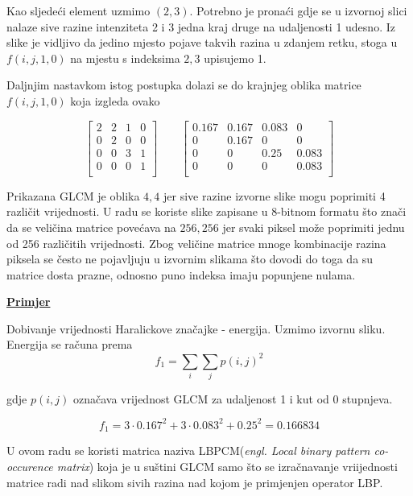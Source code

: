 \documentclass[times, utf8, zavrsni]{fer}
\begin{document}
\bigbreak

Kao sljedeći element uzmimo \((2,3)\).
Potrebno je pronaći gdje se u izvornoj slici nalaze sive razine intenziteta
2 i 3 jedna kraj druge na udaljenosti 1 udesno. Iz slike je vidljivo da 
jedino mjesto pojave takvih razina u zdanjem retku, stoga u \(f(i,j,1,0)\)
na mjestu s indeksima \(2,3\) upisujemo 1. 

\newpage

Daljnjim nastavkom istog postupka
dolazi se do krajnjeg oblika matrice \(f(i,j,1,0)\) koja izgleda ovako

\begin{minipage}{\linewidth}
\centering
\[
\begin{bmatrix}
2&2&1&0\\
0&2&0&0\\
0&0&3&1\\
0&0&0&1\\
\end{bmatrix}
\quad
\quad
\begin{bmatrix}
0.167&0.167&0.083&0\\
0&0.167&0&0\\
0&0&0.25&0.083\\
0&0&0&0.083\\
\end{bmatrix}
\]
\end{minipage}

Prikazana GLCM je oblika \(4,4\) jer sive razine izvorne slike mogu poprimiti
4 različit vrijednosti. U radu se koriste slike zapisane u 8-bitnom formatu
što znači da se veličina matrice povećava na \(256,256\) jer svaki piksel može
poprimiti jednu od 256 različitih vrijednosti. Zbog veličine matrice mnoge
kombinacije razina piksela se često ne pojavljuju u izvornim slikama što
dovodi do toga da su matrice dosta prazne, odnosno puno indeksa imaju popunjene 
nulama.

\bigbreak

\underline{\textbf{Primjer}}

Dobivanje vrijednosti Haralickove značajke - energija. Uzmimo izvornu sliku.
Energija se računa prema
\[
f_1 = \sum_{i}\sum_{j}p(i,j)^2
\]

gdje \(p(i,j)\) označava vrijednost GLCM za udaljenost 1 i kut od 0 stupnjeva.

\[
f_1 = 3 \cdot 0.167^2 + 3 \cdot 0.083^2 + 0.25^2 = 0.166834
\]

U ovom radu se koristi matrica naziva LBPCM(\textit{engl. Local binary pattern co-occurence matrix})
koja je u suštini GLCM samo što se izračnavanje vriijednosti matrice 
radi nad slikom sivih razina nad kojom je primjenjen operator LBP.
\end{document}
